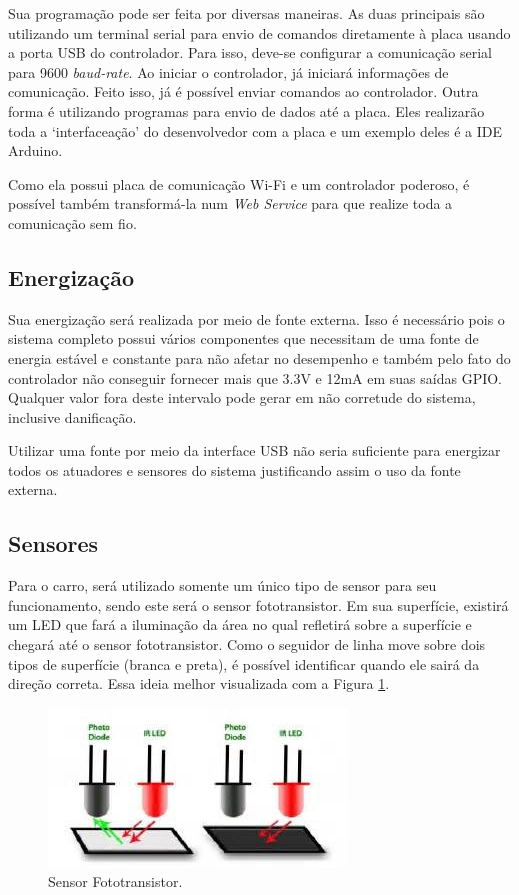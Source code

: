 \documentclass[portugues, brazil, a4paper,12pt]{article}
\begin{document}
		Sua programação pode ser feita por diversas maneiras. As duas principais são utilizando um terminal serial para envio de comandos diretamente à placa usando a porta USB do controlador. Para isso, deve-se configurar a comunicação serial para 9600 \textit{baud-rate}. Ao iniciar o controlador, já iniciará informações de comunicação. Feito isso, já é possível enviar comandos ao controlador. Outra forma é utilizando programas para envio de dados até a placa. Eles realizarão toda a `interfaceação' do desenvolvedor com a placa e um exemplo deles é a IDE Arduino.
		
		Como ela possui placa de comunicação Wi-Fi e um controlador poderoso, é possível também transformá-la num \textit{Web Service} para que realize toda a comunicação sem fio.

	\subsection{Energização}
		Sua energização será realizada por meio de fonte externa. Isso é necessário pois o sistema completo possui vários componentes que necessitam de uma fonte de energia estável e constante para não afetar no desempenho e também pelo fato do controlador não conseguir fornecer mais que 3.3V e 12mA em suas saídas GPIO. Qualquer valor fora deste intervalo pode gerar em não corretude do sistema, inclusive danificação.
		
		Utilizar uma fonte por meio da interface USB não seria suficiente para energizar todos os atuadores e sensores do sistema justificando assim o uso da fonte externa.
	
	\subsection{Sensores}
		Para o carro, será utilizado somente um único tipo de sensor para seu funcionamento, sendo este será o sensor fototransistor. Em sua superfície, existirá um LED que fará a iluminação da área no qual refletirá sobre a superfície e chegará até o sensor fototransistor. Como o seguidor de linha move sobre dois tipos de superfície (branca e preta), é possível identificar quando ele sairá da direção correta. Essa ideia melhor visualizada com a Figura \ref{fig:ft}.
		
		\begin{figure}[H]
			\centering
			\includegraphics[width=0.4\linewidth]{img/eq-fototransistor.jpg}
			\caption{Sensor Fototransistor.}
			\label{fig:ft}
		\end{figure}
		
\end{document}
